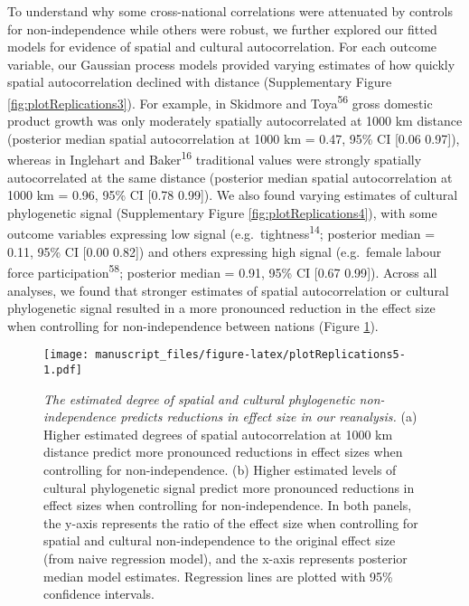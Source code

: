 \documentclass[english,man,floatsintext]{apa6}
\begin{document}
To understand why some cross-national correlations were attenuated by controls for non-independence while others were robust, we further explored our fitted models for evidence of spatial and cultural autocorrelation. For each outcome variable, our Gaussian process models provided varying estimates of how quickly spatial autocorrelation declined with distance (Supplementary Figure \ref{fig:plotReplications3}). For example, in Skidmore and Toya\textsuperscript{56} gross domestic product growth was only moderately spatially autocorrelated at 1000 km distance (posterior median spatial autocorrelation at 1000 km = 0.47, 95\% CI {[}0.06 0.97{]}), whereas in Inglehart and Baker\textsuperscript{16} traditional values were strongly spatially autocorrelated at the same distance (posterior median spatial autocorrelation at 1000 km = 0.96, 95\% CI {[}0.78 0.99{]}). We also found varying estimates of cultural phylogenetic signal (Supplementary Figure \ref{fig:plotReplications4}), with some outcome variables expressing low signal (e.g.~tightness\textsuperscript{14}; posterior median = 0.11, 95\% CI {[}0.00 0.82{]}) and others expressing high signal (e.g.~female labour force participation\textsuperscript{58}; posterior median = 0.91, 95\% CI {[}0.67 0.99{]}). Across all analyses, we found that stronger estimates of spatial autocorrelation or cultural phylogenetic signal resulted in a more pronounced reduction in the effect size when controlling for non-independence between nations (Figure \ref{fig:plotReplications5}).



\begin{figure}
\centering
\texttt{[image: manuscript\_files/figure-latex/plotReplications5-1.pdf]}
\caption{\label{fig:plotReplications5}\emph{The estimated degree of spatial and cultural phylogenetic non-independence predicts reductions in effect size in our reanalysis.} (a) Higher estimated degrees of spatial autocorrelation at 1000 km distance predict more pronounced reductions in effect sizes when controlling for non-independence. (b) Higher estimated levels of cultural phylogenetic signal predict more pronounced reductions in effect sizes when controlling for non-independence. In both panels, the y-axis represents the ratio of the effect size when controlling for spatial and cultural non-independence to the original effect size (from naive regression model), and the x-axis represents posterior median model estimates. Regression lines are plotted with 95\% confidence intervals.}
\end{figure}
\end{document}

